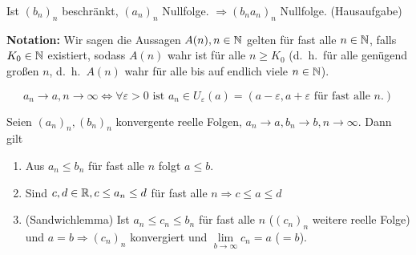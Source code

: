 \documentclass[../ana1.tex]{subfiles}
\begin{document}
\begin{bsp}
	Ist \( {(b_n)}_n \) beschränkt, \( {(a_n)}_n \) Nullfolge. \( \Rightarrow {(b_n a_n)}_n \) Nullfolge. (Hausaufgabe)
\end{bsp}
\textbf{Notation:} Wir sagen die Aussagen \( A(n), n\in\mathbb{N} \) gelten für fast alle \( n\in\mathbb{N} \), falls \( K_0\in\mathbb{N} \) existiert, sodass \(A(n)\) wahr ist für alle \( n\geq K_0 \) (d.\ h.\ für alle genügend großen \( n \), d.\ h.\  \( A(n) \) wahr für alle bis auf endlich viele \(n\in\mathbb{N} \)).
\begin{bsp}
	\[ a_n\rightarrow a,n\rightarrow\infty \Leftrightarrow \forall \varepsilon > 0 \text{ ist } a_n\in U_\varepsilon(a) = (a-\varepsilon, a+\varepsilon \text{ für fast alle } n.)  \]
\end{bsp}
\begin{satz}
	Seien \( {(a_n)}_n, {(b_n)}_n\) konvergente reelle Folgen, \( a_n\rightarrow a, b_n \rightarrow b, n\rightarrow\infty \). Dann gilt
	\begin{enumerate}
			\item Aus \(a_n\leq b_n\) für fast alle \(n\) folgt \(a\leq b\).
			\item Sind \(c,d\in\mathbb{R}, c\leq a_n\leq d \) für fast alle \(n \Rightarrow c\leq a\leq d\)
			\item (Sandwichlemma) Ist \(a_n \leq c_n \leq b_n \) für fast alle \(n\) (\( {(c_n)}_n \) weitere reelle Folge) und \( a=b \Rightarrow {(c_n)}_n \) konvergiert und \( \lim\limits_{b\rightarrow\infty}c_n = a \) (\( =b \)).
	\end{enumerate}
\end{satz}
\end{document}
